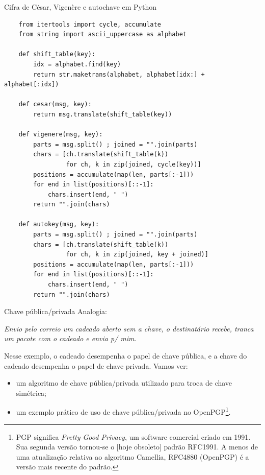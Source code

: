 \documentclass[utf8]{beamer}
\begin{document}
\begin{frame}[fragile]{Cifra de César, Vigenère e autochave em Python}
  \begin{verbatim}
    from itertools import cycle, accumulate
    from string import ascii_uppercase as alphabet

    def shift_table(key):
        idx = alphabet.find(key)
        return str.maketrans(alphabet, alphabet[idx:] + alphabet[:idx])

    def cesar(msg, key):
        return msg.translate(shift_table(key))

    def vigenere(msg, key):
        parts = msg.split() ; joined = "".join(parts)
        chars = [ch.translate(shift_table(k))
                 for ch, k in zip(joined, cycle(key))]
        positions = accumulate(map(len, parts[:-1]))
        for end in list(positions)[::-1]:
            chars.insert(end, " ")
        return "".join(chars)

    def autokey(msg, key):
        parts = msg.split() ; joined = "".join(parts)
        chars = [ch.translate(shift_table(k))
                 for ch, k in zip(joined, key + joined)]
        positions = accumulate(map(len, parts[:-1]))
        for end in list(positions)[::-1]:
            chars.insert(end, " ")
        return "".join(chars)
  \end{verbatim}
\end{frame}


\begin{frame}{Chave pública/privada}
  Analogia:
  \begin{adjustwidth}{2em}{1em}\emph{
    Envio pelo correio um cadeado aberto sem a chave,
    o destinatário recebe,
    tranca um pacote com o cadeado e envia p/ mim.
  }\end{adjustwidth}
  Nesse exemplo, o cadeado desempenha o papel de chave pública,
  e a chave do cadeado desempenha o papel de chave privada.
  \vfill
  Vamos ver:
  \begin{itemize}
    \item
    um algoritmo de chave pública/privada
    utilizado para troca de chave simétrica;
    \item
    um exemplo prático de uso de chave pública/privada
    no OpenPGP\footnote{
      PGP significa \emph{Pretty Good Privacy},
      um software comercial criado em 1991.
      Sua segunda versão tornou-se o [hoje obsoleto] padrão RFC1991.
      A menos de uma atualização relativa ao algoritmo Camellia,
      RFC4880 (OpenPGP) é a versão mais recente do padrão.
    }.
  \end{itemize}
\end{frame}
\end{document}
